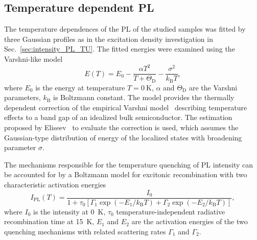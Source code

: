 \newpage
\subsection{Temperature dependent PL}
\label{Sec:temp_PL_TU}
The temperature dependences of the PL of the studied samples was fitted by three Gaussian profiles as in the excitation density investigation in Sec.~\ref{sec:intensity_PL_TU}. The fitted energies were examined using the Varshni-like model
%
\begin{equation}
E(T)=E_0-\frac{\alpha T^2}{T+\Theta_\mathrm{D}}-\frac{\sigma^2}{k_\mathrm{B}T}, \label{eq:Varshni-like}
\end{equation}
where $E_0$ is the energy at temperature $T=0~\mathrm{K}$, $\alpha$ and $\Theta_\mathrm{D}$ are the Varshni parameters, $k_\mathrm{B}$ is Boltzmann constant. The model provides the thermally dependent correction of the empirical Varshni model~\citep{Varshni} describing temperature effects to a band gap of an idealized bulk semiconductor. The estimation proposed by Eliseev~\citep{Eliseev_apl2003_PLtemp} to evaluate the correction is used, which assumes the Gaussian-type distribution of energy of the localized states with broadening parameter $\sigma$.

The mechanisms responsible for the temperature quenching of PL intensity can be accounted for by a Boltzmann model for excitonic recombination with two characteristic activation energies~\citep{Daly_prb1995, Alen_apl2011}
\begin{equation}
I_\mathrm{PL}(T)=\frac{I_0}{1+\tau_0\left[\Gamma_1\exp(-E_1/k_\mathrm{B}T)+\Gamma_2\exp(-E_2/k_\mathrm{B}T)\right]},               \label{eq:Arhenius}
\end{equation}
where $I_0$ is the intensity at 0~K, $\tau_0$ temperature-independent radiative recombination time at 15~K, $E_1$ and $E_2$ are the activation energies of the two quenching mechanisms with related scattering rates $\Gamma_1$ and $\Gamma_2$.%
\newpage

